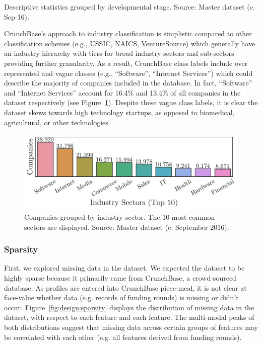 \documentclass[../thesis/thesis.tex]{subfiles}
\begin{document}
\begin{table}[!htb] %
    \centering
    \scalebox{0.9}{}
    \caption[Descriptive statistics by developmental stage]{Descriptive statistics grouped by developmental stage. Source: Master dataset (c. Sep-16).}
    \label{tab:design:descriptive_statistics}
\end{table}

CrunchBase's approach to industry classification is simplistic compared to other classification schemes (e.g., USSIC, NAICS, VentureSource) which generally have an industry hierarchy with tiers for broad industry sectors and sub-sectors providing further granularity. As a result, CrunchBase class labels include over represented and vague classes (e.g., ``Software'', ``Internet Services'') which could describe the majority of companies included in the database. In fact, ``Software'' and ``Internet Services'' account for 16.4\% and 13.4\% of all companies in the dataset respectively (see Figure~\ref{fig:design:industry_counts}). Despite these vague class labels, it is clear the dataset skews towards high technology startups, as opposed to biomedical, agricultural, or other technologies.

\begin{figure}[!htb]
    \centering
    \includegraphics[width=\textwidth]{../figures/design/descriptives_counts_industry}
    \caption[Company counts by industry sector]{Companies grouped by industry sector. The 10 most common sectors are displayed. Source: Master dataset (c. September 2016).}
    \label{fig:design:industry_counts}
\end{figure}

\subsubsection{Sparsity}

First, we explored missing data in the dataset. We expected the dataset to be highly sparse because it primarily came from CrunchBase, a crowd-sourced database. As profiles are entered into CrunchBase piece-meal, it is not clear at face-value whether data (e.g. records of funding rounds) is missing or didn't occur. Figure~\ref{fig:design:sparsity} displays the distribution of missing data in the dataset, with respect to each feature and each feature. The multi-modal peaks of both distributions suggest that missing data across certain groups of features may be correlated with each other (e.g. all features derived from funding rounds).
\end{document}
